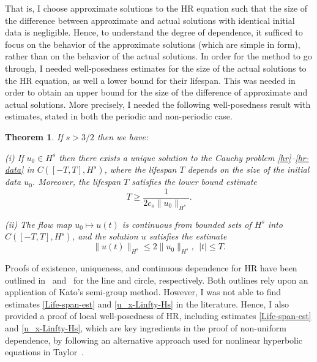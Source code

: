 \documentclass[12pt,reqno]{amsart}
\newtheorem{theorem}{Theorem}
\begin{document}
That is, I choose 
approximate solutions to the HR equation such that the size of the difference between approximate and actual solutions with 
identical initial data is negligible. Hence, to understand the degree of 
dependence, it sufficed to focus on the behavior of the approximate 
solutions (which are simple in form), rather than on the behavior of the 
actual solutions. In order for the method to go through, I needed 
well-posedness estimates for the size of the 
actual solutions to the HR equation, as well a 
lower bound for their lifespan. This was needed in order to obtain an upper 
bound for the size of the difference of approximate and actual solutions. 
More precisely, I needed the following well-posedness result  with estimates,  
stated in both the  periodic and non-periodic case.
%
%
%
%
%
%
\begin{theorem}
\label{thm:HR_existence_continuous_dependence}
If   $s>3/2$  then we have:

(i) If $u_0\in H^s$  then  there exists a unique solution to
the Cauchy problem  \eqref{hr}--\eqref{hr-data} in $C([-T, T], H^s)$, where 
the lifespan  $T$ depends on the size
of the initial data $u_0$. Moreover, 
the  lifespan $T$ satisfies the lower bound estimate 
%
%
%
\begin{equation}
\label{Life-span-est}
T
\ge
\frac{1}{2c_s \|u_0\|_{H^s}}.
\end{equation}
%

(ii)
The flow map $u_0 \mapsto u(t)$ is continuous from
bounded sets of $H^s$ into \\ $C([-T, T], H^s)$,
and the solution $u$ satisfies the estimate
%
%
%
\begin{equation}
\label{u_x-Linfty-Hs}
\|
u(t)
\|_ {H^s}
\le
2
\|
u_0
\|_{H^s}, \ \ |t|\le T.
\end{equation}
%
%
%
\end{theorem}
%
%
Proofs of 
existence, uniqueness, and continuous dependence for HR
have been outlined in~\cite{Yin_2003_On-the-Cauchy-p} and~\cite{Zhou_2005_Local-well-pose} for the line and circle, 
respectively. Both outlines rely upon an application of Kato's semi-group 
method. However, I was not able to find estimates  
\eqref{Life-span-est} and \eqref{u_x-Linfty-Hs}  in the literature.
Hence, I also provided a proof of local well-posedness of HR,
including  estimates \eqref{Life-span-est} and \eqref{u_x-Linfty-Hs},
which are key ingredients in the proof of non-uniform dependence, by 
following an alternative approach used for nonlinear hyperbolic equations
in Taylor~\cite{Taylor_1991_Pseudodifferent}.
\end{document}
